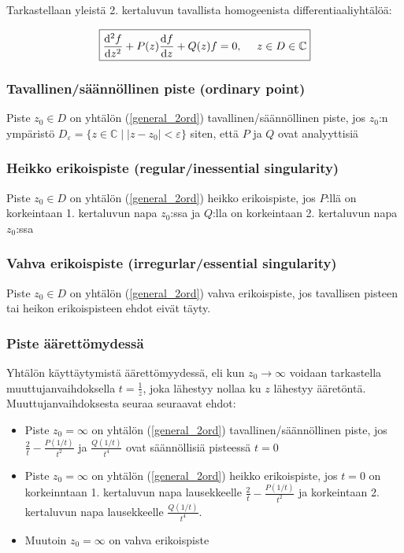 \documentclass[../johdoksia.tex]{subfiles}
\begin{document}
	Tarkastellaan yleistä 2. kertaluvun tavallista homogeenista differentiaaliyhtälöä:
	
	\begin{equation}
		\label{general_2ord}
		\boxed{\odv{^2f}{z^2} + P(z)\odv{f}{z} + Q(z)f = 0, \ \ \ \ z \in D \in \mathbb{C}}
	\end{equation}
	
	\subsubsection{Tavallinen/säännöllinen piste (ordinary point)}
	
	Piste $z_0 \in D$ on yhtälön (\ref{general_2ord}) tavallinen/säännöllinen piste, jos $z_0$:n ympäristö $D_\varepsilon = \{z \in \mathbb{C} \mid |z - z_0| < \varepsilon\}$ siten, että $P$ ja $Q$ ovat analyyttisiä
	
	\subsubsection{Heikko erikoispiste (regular/inessential singularity)}
	
	Piste $z_0 \in D$ on yhtälön (\ref{general_2ord}) heikko erikoispiste, jos $P$:llä on korkeintaan 1. kertaluvun napa $z_0$:ssa ja $Q$:lla on korkeintaan 2. kertaluvun napa $z_0$:ssa
	
	\subsubsection{Vahva erikoispiste (irregurlar/essential singularity)}
	
	Piste $z_0 \in D$ on yhtälön ({\ref{general_2ord}}) vahva erikoispiste, jos tavallisen pisteen tai heikon erikoispisteen ehdot eivät täyty.
	
	\subsubsection{Piste äärettömydessä}
	
	Yhtälön käyttäytymistä äärettömyydessä, eli kun $z_0 \to \infty$ voidaan tarkastella muuttujanvaihdoksella $t = \frac{1}{z}$, joka lähestyy nollaa ku $z$ lähestyy ääretöntä. Muuttujanvaihdoksesta seuraa seuraavat ehdot:
	
	\begin{itemize}
		\item Piste $z_0 = \infty$ on yhtälön (\ref{general_2ord}) tavallinen/säännöllinen piste, jos $\frac{2}{t} - \frac{P(1/t)}{t^2}$ ja $\frac{Q(1/t)}{t^4}$ ovat säännöllisiä pisteessä $t = 0$
		\item Piste $z_0 = \infty$ on yhtälön (\ref{general_2ord}) heikko erikoispiste, jos $t = 0$ on korkeinntaan 1. kertaluvun napa lausekkeelle $\frac{2}{t} - \frac{P(1/t)}{t^2}$ ja korkeintaan 2. kertaluvun napa lausekkeelle $\frac{Q(1/t)}{t^4}$.
		\item Muutoin $z_0 = \infty$ on vahva erikoispiste
	\end{itemize} 
	
\end{document}
